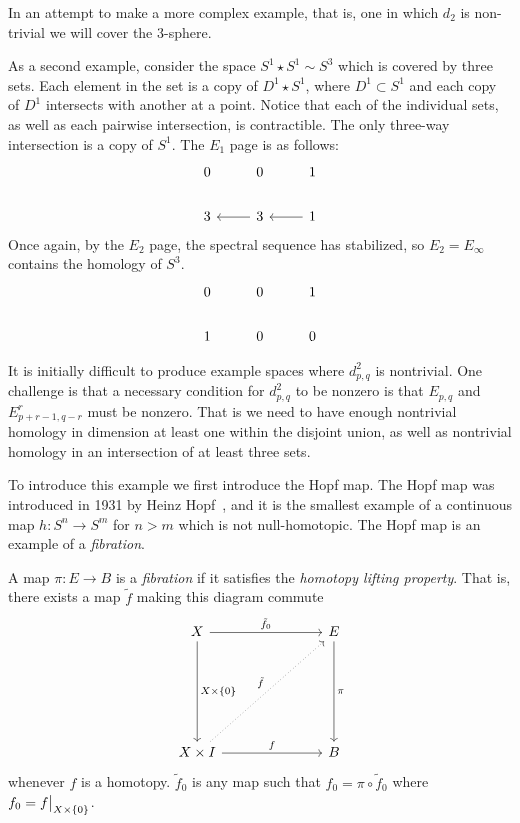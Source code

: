 In an attempt to make a more complex example, that is, one in which $d_2$ is non-trivial we will cover the 3-sphere.
\begin{example}
As a second example, consider the space $S^1 \star S^1 \sim S^3$ which is covered by three sets. Each element in the set is a copy of $D^1 \star S^1$, where $D^1 \subset S^1$ and each copy of $D^1$ intersects with another at a point. Notice that each of the individual sets, as well as each pairwise intersection, is contractible. The only three-way intersection is a copy of $S^1$. The $E_1$ page is as follows:
\[ \begin{tikzcd}
0    &  0     &   1   \\
3    & \arrow{l} 3     & \arrow{l}   1
\end{tikzcd} \]
Once again, by the $E_2$ page, the spectral sequence has stabilized, so $E_2 = E_\infty$ contains the homology of $S^3$.
\[  \begin{tikzcd}
0    &  0     &   1   \\
1    &  0     &   0
\end{tikzcd}
\]
\end{example}
It is initially difficult to produce example spaces where $d^2_{p,q}$ is nontrivial. One challenge is that a necessary condition for $d^2_{p,q}$ to be nonzero is that $E_{p,q}$ and $E^r_{p+r-1, q-r}$ must be nonzero. That is we need to have enough nontrivial homology in dimension at least one within the disjoint union, as well as nontrivial homology in an intersection of at least three sets. 

To introduce this example we first introduce the Hopf map. The Hopf map was introduced  in 1931 by Heinz Hopf~\cite{hopf}, and it is the smallest example of a continuous map $h : S^n \rightarrow S^m$ for $n > m$ which is not null-homotopic. The Hopf map is an example of a \emph{fibration}.
\begin{definition}
A map $\pi: E \rightarrow B$ is a \emph{fibration} if it satisfies the \emph{homotopy lifting property}.
That is, there exists a map $\tilde{f}$ making this diagram commute
\[ \begin{tikzcd}[column sep=1in,row sep=1in]
X \arrow{d}{X \times \{0\}} \arrow{r}{\tilde{f}_0} & E \arrow{d}{\pi} \\
X \times I  \arrow{r}{f} \arrow[dotted]{ur}{\tilde{f}} & B
\end{tikzcd} \]
whenever $f$ is a homotopy. $\tilde{f}_0$ is any map such that $f_0 = \pi \circ \tilde{f}_0$ where $f_0 = \restr{f}{X \times \{0\}}$.
\end{definition}	


